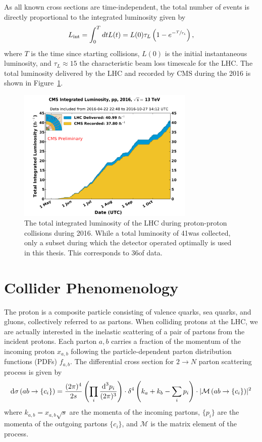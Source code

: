 As all known cross sections are time-independent, the total number of events is directly proportional to the integrated luminosity given by
\begin{equation}
  L_{\text{int}} = \int_0^T dt L(t) = L(0) \tau_L \left(1 - e^{-\sfrac{T}{\tau_L}} \right),
\end{equation}
where $T$ is the time since starting collisions,
$L(0)$ is the initial instantaneous luminosity,
and $\tau_L \approx 15$ the characteristic beam loss timescale for the LHC.
The total luminosity delivered by the LHC and recorded by CMS during the 2016 is shown in Figure~\ref{fig:lumi}.

\begin{figure}[htbp]
  \centering
  \includegraphics[width=0.75\textwidth]{Collider/Figures/lumi_2016.pdf}
  \caption{
    The total integrated luminosity of the LHC during proton-proton collisions during 2016.\cite{}
    While a total luminosity of 41\fbinv was collected, only a subset during which the detector operated optimally is used in this thesis. This corresponds to 36\fbinv of data.
  }
  \label{fig:lumi}
\end{figure}

\section{Collider Phenomenology}
\label{sec:collider_pheno}

The proton is a composite particle consisting of valence quarks, sea quarks, and gluons, collectively referred to as partons.
When colliding protons at the LHC, we are actually interested in the inelastic scattering of a pair of partons from the incident protons.
Each parton $a,b$ carries a fraction of the momentum of the incoming proton $x_{a,b}$ following the particle-dependent parton distribution functions (PDFs) $f_{a,b}$.
The differential cross section for $2\rightarrow N$ parton scattering process is given by
\begin{equation}
  \text{d}\sigma \left(ab \rightarrow \{c_i\} \right) =
  \frac{(2\pi)^4}{2s} \left( \prod_i \frac{\text{d}^3 p_i}{(2\pi)^3} \right)
  \cdot \delta^4 \left(k_a + k_b - \sum_i p_i \right)
  \cdot \lvert  \mathcal{M} \left(ab \rightarrow \{c_i\} \right) \rvert^2
\end{equation}
where $k_{a,b} = x_{a,b} \sqrt{s}$ are the momenta of the incoming partons, $\{p_i\}$ are the momenta of the outgoing partons $\{c_i\}$, and $\mathcal{M}$ is the matrix element of the process.

